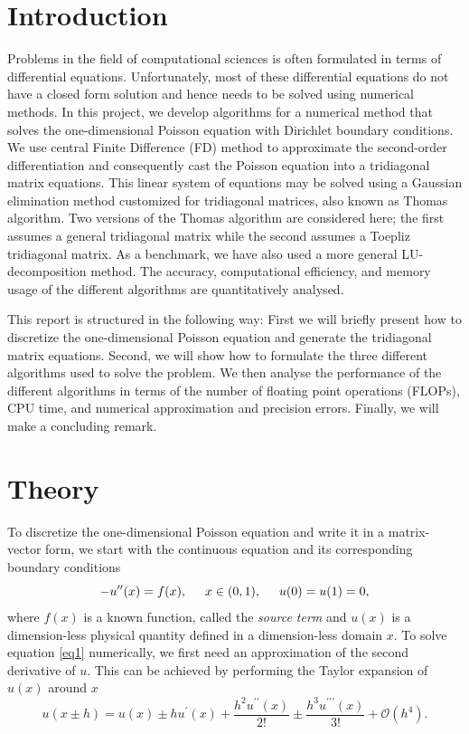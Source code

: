 \documentclass[a4paper]{article}
\begin{document}
\section{Introduction}
Problems in the field of computational sciences is often formulated in terms of differential equations. Unfortunately, most of these differential equations do not have a closed form solution and hence needs to be solved using numerical methods. In this project, we develop algorithms for a numerical method that solves the one-dimensional Poisson equation with Dirichlet boundary conditions. We use central Finite Difference (FD) method to approximate the second-order differentiation and consequently cast the Poisson equation into a tridiagonal matrix equations. This linear system of equations may be solved using a Gaussian elimination method customized for tridiagonal matrices, also known as Thomas algorithm. Two versions of the Thomas algorithm are considered here; the first assumes a general tridiagonal matrix while the second assumes a Toepliz tridiagonal matrix. As a benchmark, we have also used a more general LU-decomposition method. The accuracy, computational efficiency, and memory usage of the different algorithms are quantitatively analysed.

This report is structured in the following way: First we will briefly present how to discretize the one-dimensional Poisson equation and generate the tridiagonal matrix equations. Second, we will show how to formulate the three different algorithms used to solve the problem. We then analyse the performance of the different algorithms in terms of the number of floating point operations (FLOPs), CPU time, and numerical approximation and precision errors. Finally, we will make a concluding remark.

\section{Theory}
To discretize the one-dimensional Poisson equation and write it in a matrix-vector form, we start with the continuous equation and its corresponding boundary conditions
\begin{equation}
-u''(x) = f(x), \hspace{0.5cm} x\in(0,1), \hspace{0.5cm} u(0) = u(1) = 0,
\label{eq1}
\end{equation}
where $f(x)$ is a known function, called the \textit{source term} and $u(x)$ is a dimension-less physical quantity defined in a dimension-less domain $x$. To solve equation \eqref{eq1} numerically, we first need an approximation of the second derivative of $u$. This can be achieved by performing the Taylor expansion of $u(x)$ around $x$        
\begin{equation}
  u(x\pm h) = u(x) \pm h u^{\prime}(x) + \frac{h^2 u^{\prime\prime}(x)}{2!} \pm  \frac{h^3 u^{\prime\prime\prime}(x)}{3!} + \mathcal{O}(h^4).
\end{equation}
\end{document}
